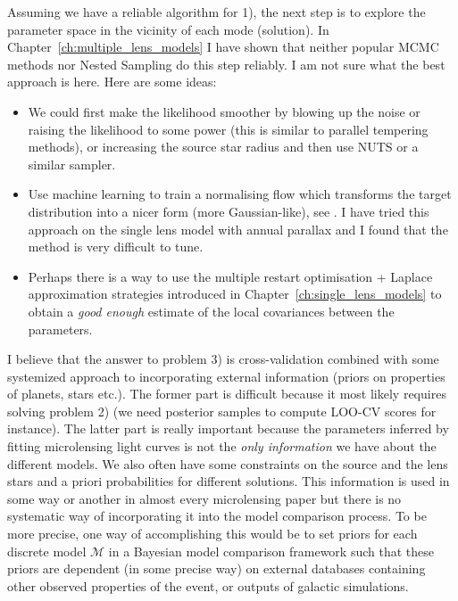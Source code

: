 \documentclass[12pt,dvipsnames]{report}
\begin{document}
Assuming we have a reliable algorithm for 1), the next step is to explore the parameter 
space in the vicinity of each mode (solution). In Chapter~\ref{ch:multiple_lens_models} I 
have shown that neither popular MCMC methods nor Nested Sampling do this step reliably. 
I am not sure what the best approach is here. Here are some ideas:
\begin{itemize}
    \item We could first make the likelihood smoother by blowing up the noise or raising the 
    likelihood to some power (this is similar to parallel tempering methods), or 
    increasing the source star radius and then use NUTS or a similar sampler. 
    \item Use machine learning to train a normalising flow which transforms the target 
    distribution into a nicer form (more Gaussian-like), see \citet{arXiv:1903.03704}. 
    I have tried this approach on the single lens model with annual parallax and I found 
    that the method is very difficult to tune.
    \item Perhaps there is a way to use the multiple restart optimisation + Laplace approximation 
    strategies introduced in Chapter~\ref{ch:single_lens_models} to obtain a \emph{good enough}
    estimate of the local covariances between the parameters.
\end{itemize}

I believe that the answer to problem 3) is cross-validation combined with some systemized approach to 
incorporating external information (priors on properties of planets, stars etc.). The 
former part is difficult because it most likely requires solving problem 2) (we need 
posterior samples to compute LOO-CV scores for instance). The latter part is really 
important  because the parameters inferred by fitting microlensing light curves 
is not the \emph{only information} we have about the different models.
We also often have some constraints on the source and the lens stars and a priori probabilities
for different solutions. This information is used in some way or another in almost every 
microlensing paper but there is no systematic way of incorporating it 
into the model comparison process. To be more precise, one way of accomplishing this would be 
to set priors for each discrete model $\mathcal{M}$ in a Bayesian model comparison 
framework such that these priors are dependent (in some precise way) on external 
databases containing other observed properties of the event, or outputs of galactic 
simulations. 
\end{document}
